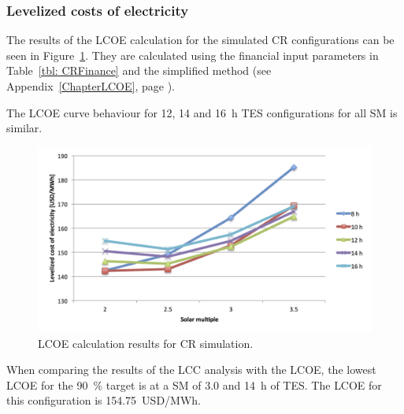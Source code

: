 \subsubsection{Levelized costs of electricity}

The results of the \ac{LCOE} calculation for the simulated \ac{CR} configurations can be seen in Figure~\ref{CR_LCOE}. They are calculated using the financial input parameters in Table~\ref{tbl: CRFinance} and the simplified method (see Appendix~\ref{ChapterLCOE}, page \pageref{ChapterLCOE}). 

The \ac{LCOE} curve behaviour for 12, 14 and \SI{16}{h} \ac{TES} configurations for all \ac{SM} is similar.

\begin{figure}[htbp]  
\centering
\includegraphics[width=1\linewidth]{FIG/CR_LCOE}
\caption[LCOE calculation results for CR simulation.]{LCOE calculation results for CR simulation.}\label{CR_LCOE}
\end{figure}

When comparing the results of the \ac{LCC} analysis with the \ac{LCOE}, the lowest \ac{LCOE} for the \SI{90}{\percent} target is at a \ac{SM} of 3.0 and \SI{14}{h} of \ac{TES}. The \ac{LCOE} for this configuration is \SI{154.75}{USD/MWh}.

